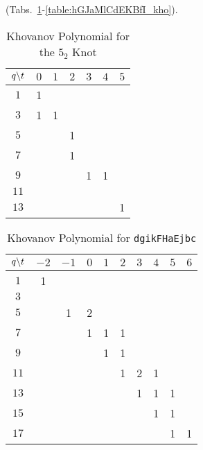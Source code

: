 \documentclass{article}
\theoremstyle{plain}
\begin{document}
        (Tabs.~\ref{table:m_3_kho}-\ref{table:hGJaMlCdEKBfI_kho}).
        \begin{table}[H]
            \centering
            \begin{tabular}{| c | c | c | c | c | c | c |}
                \hline
                $q\symbol{92}t$&$0$&$1$&$2$&$3$&$4$&$5$\\
                \hline
                $1$&1&&&&&\\
                \hline
                $3$&1&1&&&&\\
                \hline
                $5$&&&1&&&\\
                \hline
                $7$&&&1&&&\\
                \hline
                $9$&&&&1&1&\\
                \hline
                $11$&&&&&&\\
                \hline
                $13$&&&&&&1\\
                \hline
            \end{tabular}
            \caption{Khovanov Polynomial for the $5_{2}$ Knot}
            \label{table:m_3_kho}
        \end{table}
        \begin{table}[H]
            \centering
            \begin{tabular}{| c | c | c | c | c | c | c | c | c | c |}
                \hline
                $q\symbol{92}t$&$-2$&$-1$&$0$&$1$&$2$&$3$&$4$&$5$&$6$\\
                \hline
                $1$&1&&&&&&&&\\
                \hline
                $3$&&&&&&&&&\\
                \hline
                $5$&&1&2&&&&&&\\
                \hline
                $7$&&&1&1&1&&&&\\
                \hline
                $9$&&&&1&1&&&&\\
                \hline
                $11$&&&&&1&2&1&&\\
                \hline
                $13$&&&&&&1&1&1&\\
                \hline
                $15$&&&&&&&1&1&\\
                \hline
                $17$&&&&&&&&1&1\\
                \hline
            \end{tabular}
            \caption{Khovanov Polynomial for \texttt{dgikFHaEjbc}}
            \label{table:dgikFHaEjbc_kho}
        \end{table}
\end{document}
